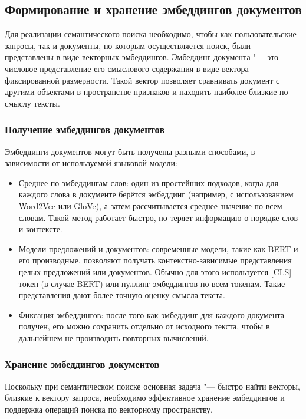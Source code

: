 \documentclass[coursework]{SCWorks}
\begin{document}
\subsection{Формирование и хранение эмбеддингов документов}

Для реализации семантического поиска необходимо, чтобы как пользовательские запросы, так и документы, по которым осуществляется поиск, были представлены в виде векторных эмбеддингов. Эмбеддинг документа "--- это числовое представление его смыслового содержания в виде вектора фиксированной размерности. Такой вектор позволяет сравнивать документ с другими объектами в пространстве признаков и находить наиболее близкие по смыслу тексты\cite{ye2016word}.

\subsubsection{Получение эмбеддингов документов}
Эмбеддинги документов могут быть получены разными способами, в зависимости от используемой языковой модели:
\begin{itemize}
    \item 
    Среднее по эмбеддингам слов: один из простейших подходов, когда для каждого слова в документе берётся эмбеддинг (например, с использованием Word2Vec или GloVe), а затем рассчитывается среднее значение по всем словам. Такой метод работает быстро, но теряет информацию о порядке слов и контексте.
    
    \item Модели предложений и документов: современные модели, такие как BERT и его производные, позволяют получать контекстно-зависимые представления целых предложений или документов. Обычно для этого используется [CLS]-токен (в случае BERT) или пуллинг эмбеддингов по всем токенам. Такие представления дают более точную оценку смысла текста.
    
    \item Фиксация эмбеддингов: после того как эмбеддинг для каждого документа получен, его можно сохранить отдельно от исходного текста, чтобы в дальнейшем не производить повторных вычислений.
\end{itemize}

\subsubsection{Хранение эмбеддингов документов}
Поскольку при семантическом поиске основная задача "--- быстро найти векторы, близкие к вектору запроса, необходимо эффективное хранение эмбеддингов и поддержка операций поиска по векторному пространству.
\end{document}
